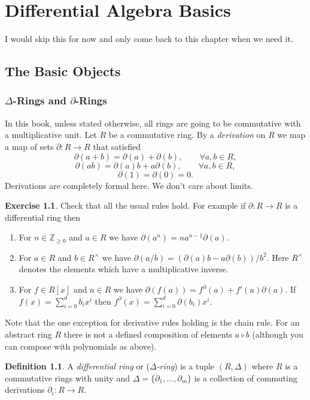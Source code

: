 \documentclass[12pt]{book}
\numberwithin{equation}{section}
\theoremstyle{definition}
\newtheorem{definition}[theorem]{Definition}
\newtheorem{exercise}[theorem]{Exercise}
\theoremstyle{remark}
\newcommand{\ZZ}{\mathbb{Z}}
\begin{document}
\mainmatter

\tableofcontents


\chapter{Differential Algebra Basics}
I would skip this for now and only come back to this chapter when we need it. 

\section{The Basic Objects}

\subsection{$\Delta$-Rings and $\partial$-Rings}
In this book, unless stated otherwise, all rings are going to be commutative with a multiplicative unit. 
Let $R$ be a commutative ring. 
By a \emph{derivation} on $R$ we map a map of sets $\partial:R\to R$ that satisfied 
 $$ \partial(a+b) = \partial(a) + \partial(b), \qquad \forall a,b\in R,$$
 $$ \partial(ab) = \partial(a) b + a\partial(b), \qquad \forall a, b \in R, $$
 $$ \partial(1) = \partial(0) = 0.$$
Derivations are completely formal here. 
We don't care about limits. 

\begin{exercise}
	Check that all the usual rules hold. For example if $\partial:R \to R$ is a differential ring then 
	\begin{enumerate}
		\item For $n\in \ZZ_{\geq 0}$ and $a \in R$ we have $\partial(a^n) = na^{n-1}\partial(a)$.
		\item For $a \in R$ and $b\in R^{\times}$ we have $\partial(a/b) = (\partial(a)b - a \partial(b))/b^2$. Here $R^{\times}$ denotes the elements which have a multiplicative inverse.
		\item For $f \in R[x]$ and $a \in R$ we have $\partial(f(a)) = f^{\partial}(a) + f'(a)\partial(a)$. If $f(x) = \sum_{i=0}^d b_i x^i$ then $f^{\partial}(x) = \sum_{i=0}^d \partial(b_i) x^i$. 
	\end{enumerate}
\end{exercise}
Note that the one exception for derivative rules holding is the chain rule. 
For an abstract ring $R$ there is not a defined composition of elements $a\circ b$ (although you can compose with polynomials as above).


\begin{definition}
	A \emph{differential ring} or (\emph{$\Delta$-ring}) is a tuple $(R,\Delta)$ where $R$ is a commutative rings with unity and $\Delta = \lbrace \partial_1,\ldots,\partial_m\rbrace$ is a collection of commuting derivations $\partial_i:R \to R$. 
\end{definition}
\end{document}
